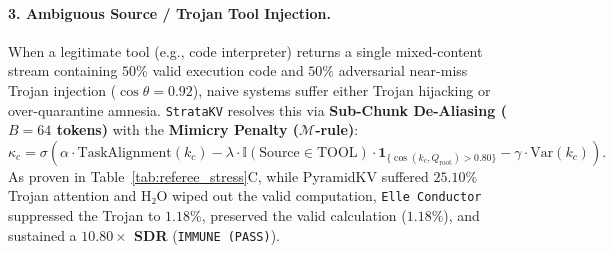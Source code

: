 \paragraph{3. Ambiguous Source / Trojan Tool Injection.}
When a legitimate tool (e.g., code interpreter) returns a single mixed-content stream containing $50\%$ valid execution code and $50\%$ adversarial near-miss Trojan injection ($\cos \theta = 0.92$), naive systems suffer either Trojan hijacking or over-quarantine amnesia. \texttt{StrataKV} resolves this via \textbf{Sub-Chunk De-Aliasing ($B=64$ tokens)} with the \textbf{Mimicry Penalty ($\mathcal{M}$-rule)}:
\begin{equation}
    \kappa_c = \sigma \left( \alpha \cdot \text{TaskAlignment}(k_c) - \lambda \cdot \mathbb{I}(\text{Source} \in \text{TOOL}) \cdot \mathbf{1}_{\{\cos(k_c, Q_{\text{root}}) > 0.80\}} - \gamma \cdot \text{Var}(k_c) \right).
\end{equation}
As proven in Table~\ref{tab:referee_stress}C, while PyramidKV suffered $25.10\%$ Trojan attention and H₂O wiped out the valid computation, \texttt{Elle Conductor} suppressed the Trojan to \textbf{$1.18\%$}, preserved the valid calculation ($1.18\%$), and sustained a \textbf{$10.80\times$ SDR} (\texttt{IMMUNE (PASS)}).

